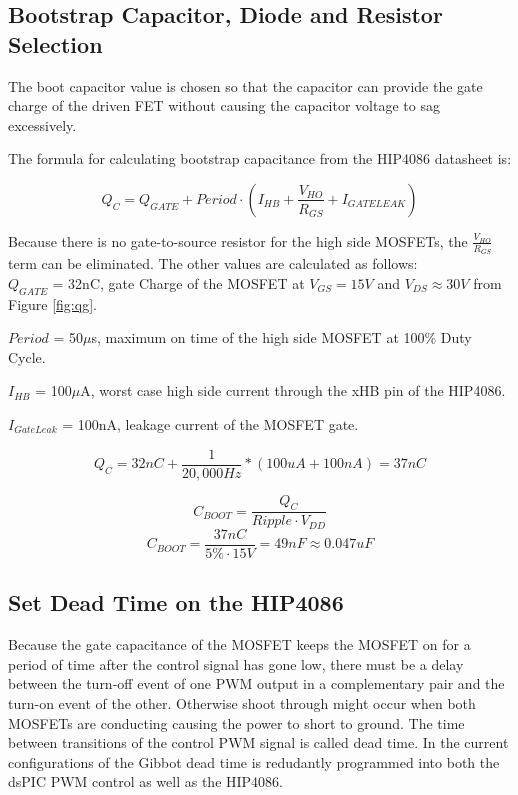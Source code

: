 \documentclass{article}
\begin{document}

\subsection{Bootstrap Capacitor, Diode and Resistor Selection}
\label{sec:bootstrap}
The boot capacitor value is chosen so that the capacitor can provide the gate charge of the driven FET without causing the capacitor voltage to sag excessively. 

The formula for calculating bootstrap capacitance from the HIP4086 datasheet is:

\[Q_C = Q_{GATE} + Period \cdot \left ( I_{HB} + \frac{V_{HO}}{R_{GS}} + I_{GATELEAK} \right )\]

Because there is no gate-to-source resistor for the high side MOSFETs, the $\frac{V_{HO}}{R_{GS}}$ term can be eliminated. The other values are calculated as follows:\\

$Q_{GATE}$ = 32nC, gate Charge of the MOSFET at $V_{GS}=15V$ and $V_{DS} \approx 30V$ from Figure \ref{fig:qg}.

$Period$ = 50$\mu$s, maximum on time of the high side MOSFET at 100\% Duty Cycle.

$I_{HB}$ = 100$\mu$A, worst case high side current through the xHB pin of the HIP4086.

$I_{GateLeak}$ = 100nA, leakage current of the MOSFET gate.

\[Q_C = 32nC + \frac{1}{20,000Hz}*(100uA + 100 nA) = 37nC\]

\[C_{BOOT} = \frac{Q_C}{Ripple \cdot V_{DD}} \]
\[C_{BOOT} = \frac{37nC}{5\% \cdot 15V} = 49nF \approx 0.047uF\]


\subsection{Set Dead Time on the HIP4086}
\label{sec:deadtime}
Because the gate capacitance of the MOSFET keeps the MOSFET on for a period of time after the control signal has gone low, there must be a delay between the turn-off event of one PWM
output in a complementary pair and the turn-on event of the other. Otherwise shoot through might occur when both MOSFETs are conducting causing the power to short to ground. The time between transitions of the control PWM signal is called dead time. In the current configurations of the Gibbot dead time is redudantly programmed into both the dsPIC PWM control as well as the HIP4086. 
\end{document}
